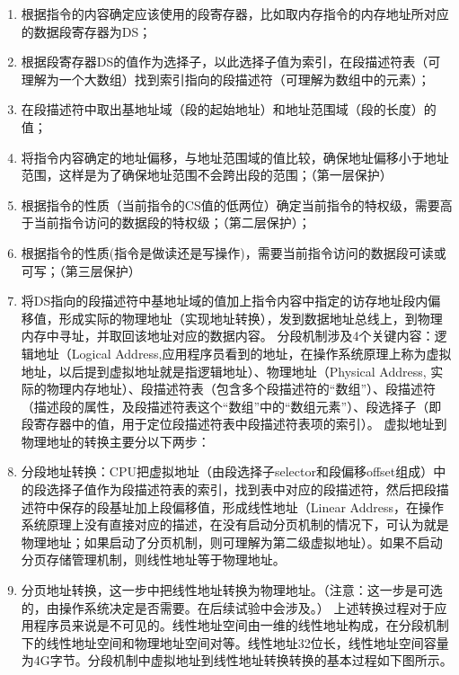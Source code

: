 \begin{enumerate}
\def\labelenumi{\arabic{enumi}.}
\item
  根据指令的内容确定应该使用的段寄存器，比如取内存指令的内存地址所对应的数据段寄存器为DS；
\item
  根据段寄存器DS的值作为选择子，以此选择子值为索引，在段描述符表（可理解为一个大数组）找到索引指向的段描述符（可理解为数组中的元素）；
\item
  在段描述符中取出基地址域（段的起始地址）和地址范围域（段的长度）的值；
\item
  将指令内容确定的地址偏移，与地址范围域的值比较，确保地址偏移小于地址范围，这样是为了确保地址范围不会跨出段的范围；（第一层保护）
\item
  根据指令的性质（当前指令的CS值的低两位）确定当前指令的特权级，需要高于当前指令访问的数据段的特权级；（第二层保护）；
\item
  根据指令的性质(指令是做读还是写操作)，需要当前指令访问的数据段可读或可写；（第三层保护）
\item
  将DS指向的段描述符中基地址域的值加上指令内容中指定的访存地址段内偏移值，形成实际的物理地址（实现地址转换），发到数据地址总线上，到物理内存中寻址，并取回该地址对应的数据内容。
  分段机制涉及4个关键内容：逻辑地址（Logical
  Address,应用程序员看到的地址，在操作系统原理上称为虚拟地址，以后提到虚拟地址就是指逻辑地址）、物理地址（Physical
  Address,
  实际的物理内存地址）、段描述符表（包含多个段描述符的``数组''）、段描述符（描述段的属性，及段描述符表这个``数组''中的``数组元素''）、段选择子（即段寄存器中的值，用于定位段描述符表中段描述符表项的索引）。
  虚拟地址到物理地址的转换主要分以下两步：
\item
  分段地址转换：CPU把虚拟地址（由段选择子selector和段偏移offset组成）中的段选择子值作为段描述符表的索引，找到表中对应的段描述符，然后把段描述符中保存的段基址加上段偏移值，形成线性地址（Linear
  Address，在操作系统原理上没有直接对应的描述，在没有启动分页机制的情况下，可认为就是物理地址；如果启动了分页机制，则可理解为第二级虚拟地址）。如果不启动分页存储管理机制，则线性地址等于物理地址。
\item
  分页地址转换，这一步中把线性地址转换为物理地址。（注意：这一步是可选的，由操作系统决定是否需要。在后续试验中会涉及。）
  上述转换过程对于应用程序员来说是不可见的。线性地址空间由一维的线性地址构成，在分段机制下的线性地址空间和物理地址空间对等。线性地址32位长，线性地址空间容量为4G字节。分段机制中虚拟地址到线性地址转换转换的基本过程如下图所示。
\end{enumerate}


